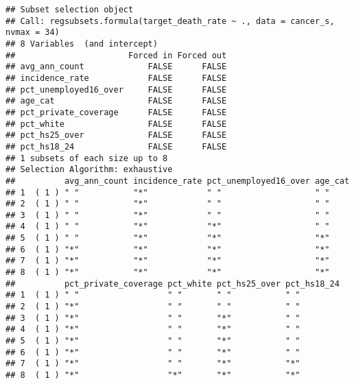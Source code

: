 \documentclass[]{article}
\begin{document}
\begin{verbatim}
## Subset selection object
## Call: regsubsets.formula(target_death_rate ~ ., data = cancer_s, nvmax = 34)
## 8 Variables  (and intercept)
##                       Forced in Forced out
## avg_ann_count             FALSE      FALSE
## incidence_rate            FALSE      FALSE
## pct_unemployed16_over     FALSE      FALSE
## age_cat                   FALSE      FALSE
## pct_private_coverage      FALSE      FALSE
## pct_white                 FALSE      FALSE
## pct_hs25_over             FALSE      FALSE
## pct_hs18_24               FALSE      FALSE
## 1 subsets of each size up to 8
## Selection Algorithm: exhaustive
##          avg_ann_count incidence_rate pct_unemployed16_over age_cat
## 1  ( 1 ) " "           "*"            " "                   " "    
## 2  ( 1 ) " "           "*"            " "                   " "    
## 3  ( 1 ) " "           "*"            " "                   " "    
## 4  ( 1 ) " "           "*"            "*"                   " "    
## 5  ( 1 ) " "           "*"            "*"                   "*"    
## 6  ( 1 ) "*"           "*"            "*"                   "*"    
## 7  ( 1 ) "*"           "*"            "*"                   "*"    
## 8  ( 1 ) "*"           "*"            "*"                   "*"    
##          pct_private_coverage pct_white pct_hs25_over pct_hs18_24
## 1  ( 1 ) " "                  " "       " "           " "        
## 2  ( 1 ) "*"                  " "       " "           " "        
## 3  ( 1 ) "*"                  " "       "*"           " "        
## 4  ( 1 ) "*"                  " "       "*"           " "        
## 5  ( 1 ) "*"                  " "       "*"           " "        
## 6  ( 1 ) "*"                  " "       "*"           " "        
## 7  ( 1 ) "*"                  " "       "*"           "*"        
## 8  ( 1 ) "*"                  "*"       "*"           "*"
\end{verbatim}
\end{document}
